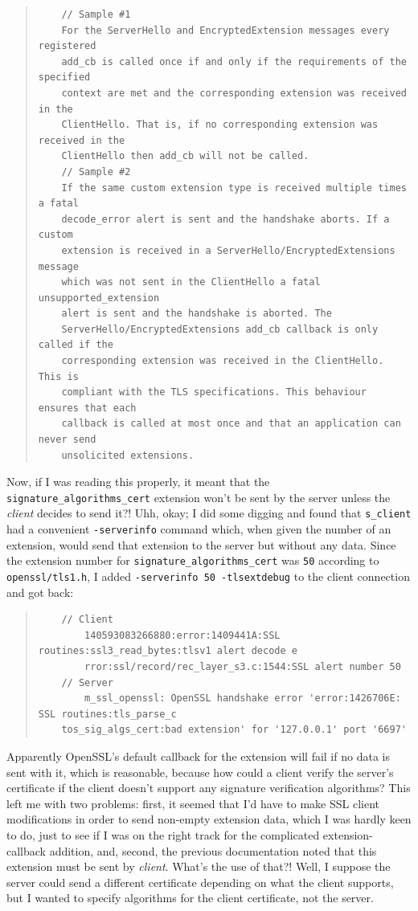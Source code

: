 \documentclass{article}
\begin{document}
\begin{quote}
\begin{verbatim}
	// Sample #1
	For the ServerHello and EncryptedExtension messages every registered
	add_cb is called once if and only if the requirements of the specified
	context are met and the corresponding extension was received in the
	ClientHello. That is, if no corresponding extension was received in the
	ClientHello then add_cb will not be called.
	// Sample #2
	If the same custom extension type is received multiple times a fatal
	decode_error alert is sent and the handshake aborts. If a custom
	extension is received in a ServerHello/EncryptedExtensions message
	which was not sent in the ClientHello a fatal unsupported_extension
	alert is sent and the handshake is aborted. The
	ServerHello/EncryptedExtensions add_cb callback is only called if the
	corresponding extension was received in the ClientHello. This is
	compliant with the TLS specifications. This behaviour ensures that each
	callback is called at most once and that an application can never send
	unsolicited extensions.
\end{verbatim}
\end{quote}

Now, if I was reading this properly, it meant that the \texttt{signature_algorithms_cert} extension won't be sent by the server unless the \emph{client} decides to send it?!  Uhh, okay; I did some digging and found that \texttt{s_client} had a convenient \texttt{-serverinfo} command which, when given the number of an extension, would send that extension to the server but without any data.  Since the extension number for \texttt{signature_algorithms_cert} was \texttt{50} according to \texttt{openssl/tls1.h}, I added \texttt{-serverinfo 50 -tlsextdebug} to the client connection and got back:

\begin{quote}
\begin{verbatim}
	// Client
        140593083266880:error:1409441A:SSL routines:ssl3_read_bytes:tlsv1 alert decode e
        rror:ssl/record/rec_layer_s3.c:1544:SSL alert number 50
	// Server
        m_ssl_openssl: OpenSSL handshake error 'error:1426706E: SSL routines:tls_parse_c
	tos_sig_algs_cert:bad extension' for '127.0.0.1' port '6697'
\end{verbatim}
\end{quote}

Apparently OpenSSL's default callback for the extension will fail if no data is sent with it, which is reasonable, because how could a client verify the server's certificate if the client doesn't support any signature verification algorithms?  This left me with two problems: first, it seemed that I'd have to make SSL client modifications in order to send non-empty extension data, which I was hardly keen to do, just to see if I was on the right track for the complicated extension-callback addition, and, second, the previous documentation noted that this extension must be sent by \emph{client}.  What's the use of that?!  Well, I suppose the server could send a different certificate depending on what the client supports, but I wanted to specify algorithms for the client certificate, not the server.
\end{document}
